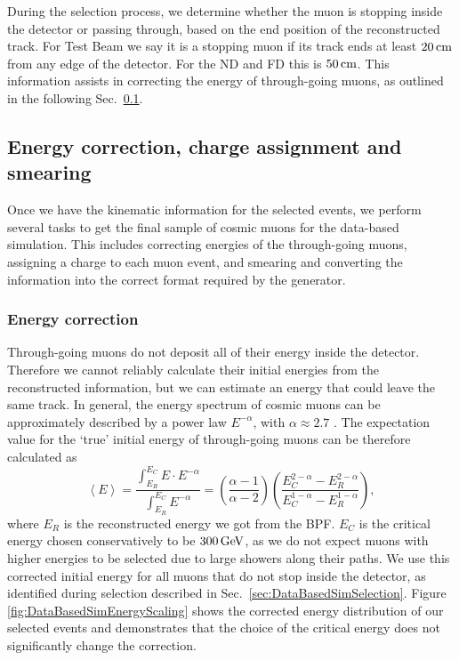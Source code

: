 During the selection process, we determine whether the muon is stopping inside the detector or passing through, based on the end position of the reconstructed track. For Test Beam we say it is a stopping muon if its track ends at least $\unit[20]{cm}$ from any edge of the detector. For the \gls{ND} and \gls{FD} this is $\unit[50]{cm}$. This information assists in correcting the energy of through-going muons, as outlined in the following Sec.~\ref{sec:DataBasedSimPython}.

\subsection{Energy correction, charge assignment and smearing}\label{sec:DataBasedSimPython}
Once we have the kinematic information for the selected events, we perform several tasks to get the final sample of cosmic muons for the data-based simulation. This includes correcting energies of the through-going muons, assigning a charge to each muon event, and smearing and converting the information into the correct format required by the generator.

\subsubsection*{Energy correction}
Through-going muons do not deposit all of their energy inside the detector. Therefore we cannot reliably calculate their initial energies from the reconstructed information, but we can estimate an energy that could leave the same track. In general, the energy spectrum of cosmic muons can be approximately described by a power law $E^{-\alpha}$, with $\alpha\approx2.7$ \cite{NOvA-doc-51327,PDG.pdf}. The expectation value for the `true' initial energy of through-going muons can be therefore calculated as
\begin{equation}
\left\langle E\right\rangle =\frac{\int^{E_C}_{E_R} E\cdot E^{-\alpha}}{\int^{E_C}_{E_R} E^{-\alpha}}=\left(\frac{\alpha -1}{\alpha -2}\right)\left(\frac{E_C^{2-\alpha}-E_R^{2-\alpha}}{E_C^{1-\alpha}-E_R^{1-\alpha}}\right),
\end{equation}
where $E_R$ is the reconstructed energy we got from the \gls{BPF}. $E_C$ is the critical energy chosen conservatively to be $\unit[300]{GeV}$, as we do not expect muons with higher energies to be selected due to large showers along their paths. We use this corrected initial energy for all muons that do not stop inside the detector, as identified during selection described in Sec.~\ref{sec:DataBasedSimSelection}. Figure \ref{fig:DataBasedSimEnergyScaling} shows the corrected energy distribution of our selected events and demonstrates that the choice of the critical energy does not significantly change the correction. 

